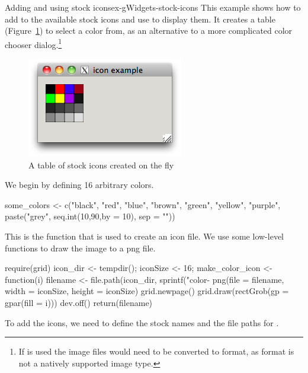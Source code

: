 \begin{example}{Adding and using stock icons}{ex-gWidgets-stock-icons}
This example shows how to add to the available stock icons and use
 to display them. It creates a table
(Figure~\ref{fig:gWidgets-stock-icons}) to select a color from, as an
alternative to a more complicated color chooser dialog.\footnote{If
   is used the image files would need to be
  converted to  format, as  format is not a
  natively supported image type.}

\begin{figure}
  \centering
  \includegraphics[width=.5\textwidth]{fig-gWidgets-icon-example.png}
  \caption{A table of stock icons created on the fly}
  \label{fig:gWidgets-stock-icons}
\end{figure}

We begin by defining 16 arbitrary colors.

\begin{Schunk}
\begin{Sinput}
 some_colors <- c("black", "red", "blue", "brown",
                 "green", "yellow", "purple",
                 paste("grey", seq.int(10,90,by = 10), sep = ""))
\end{Sinput}
\end{Schunk}

This is the function that is used to create an icon file. We use some
low-level  functions to draw the image to a png file.
\begin{Schunk}
\begin{Sinput}
 require(grid)
 icon_dir <- tempdir(); iconSize <- 16;
 make_color_icon <- function(i) {
   filename <- file.path(icon_dir, 
                         sprintf("color-%
   png(file = filename, width = iconSize, height = iconSize)
   grid.newpage()
   grid.draw(rectGrob(gp = gpar(fill = i)))
   dev.off()
   return(filename)
 }
\end{Sinput}
\end{Schunk}

To add the icons, we need to define the stock names and the file paths
for .


\end{example}
